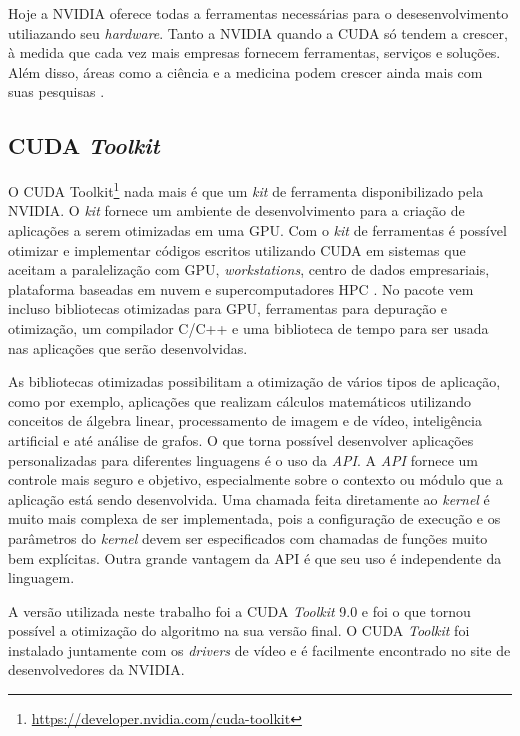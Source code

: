 \documentclass[
	12pt,				%
	twoside,			%
	a4paper,			%
	english,			%
	french,				%
	spanish,			%
	brazil				%
	]{abntex2}
\begin{document}
Hoje a NVIDIA oferece todas a ferramentas necessárias para o
desesenvolvimento utiliazando seu \emph{hardware}. Tanto a NVIDIA quando
a CUDA só tendem a crescer, à medida que cada vez mais empresas fornecem
ferramentas, serviços e soluções. Além disso, áreas como a ciência e a
medicina podem crescer ainda mais com suas pesquisas \cite{CUDA}.

\subsection{\texorpdfstring{CUDA
\emph{Toolkit}}{CUDA Toolkit}}\label{cuda-toolkit}

O CUDA Toolkit\footnote{\url{https://developer.nvidia.com/cuda-toolkit}}
nada mais é que um \emph{kit} de ferramenta disponibilizado pela NVIDIA.
O \emph{kit} fornece um ambiente de desenvolvimento para a criação de
aplicações a serem otimizadas em uma GPU. Com o \emph{kit} de
ferramentas é possível otimizar e implementar códigos escritos
utilizando CUDA em sistemas que aceitam a paralelização com GPU,
\emph{workstations}, centro de dados empresariais, plataforma baseadas
em nuvem e supercomputadores HPC \cite{TOOLKIT}. No pacote vem incluso
bibliotecas otimizadas para GPU, ferramentas para depuração e
otimização, um compilador C/C++ e uma biblioteca de tempo para ser usada
nas aplicações que serão desenvolvidas.

As bibliotecas otimizadas possibilitam a otimização de vários tipos de
aplicação, como por exemplo, aplicações que realizam cálculos
matemáticos utilizando conceitos de álgebra linear, processamento de
imagem e de vídeo, inteligência artificial e até análise de grafos. O
que torna possível desenvolver aplicações personalizadas para diferentes
linguagens é o uso da \emph{API}. A \emph{API} fornece um controle mais
seguro e objetivo, especialmente sobre o contexto ou módulo que a
aplicação está sendo desenvolvida. Uma chamada feita diretamente ao
\emph{kernel} é muito mais complexa de ser implementada, pois a
configuração de execução e os parâmetros do \emph{kernel} devem ser
especificados com chamadas de funções muito bem explícitas. Outra grande
vantagem da API é que seu uso é independente da linguagem.

A versão utilizada neste trabalho foi a CUDA \emph{Toolkit} 9.0 e foi o
que tornou possível a otimização do algoritmo na sua versão final. O
CUDA \emph{Toolkit} foi instalado juntamente com os \emph{drivers} de
vídeo e é facilmente encontrado no site de desenvolvedores da NVIDIA.
\end{document}

